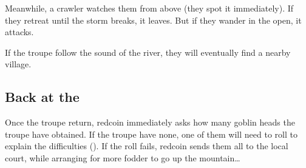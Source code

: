\begin{multicols}{2}
  Meanwhile, a \gls{crawler} watches them from above (they spot it immediately).
  If they retreat until the storm breaks, it leaves.
  But if they wander in the open, it attacks.
\fi

If the troupe follow the sound of the river, they will eventually find a nearby \gls{village}.

\subsection{Back at the }

Once the troupe return, \gls{redcoin} immediately asks how many goblin heads the troupe have obtained.
If the troupe have none, one of them will need to roll  to explain the difficulties (\tn[8]).
If the roll fails, \gls{redcoin} sends them all to the local \gls{court}, while arranging for more \gls{fodder} to go up the mountain\ldots

\end{multicols}
